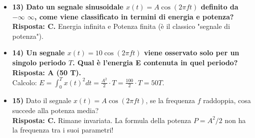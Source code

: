 \begin{itemize}
    \item \textbf{13) Dato un segnale sinusoidale $x(t) = A \cos(2\pi f t)$ definito da $-\infty$ $\infty$, come viene classificato in termini di energia e potenza?} \\
    \textbf{Risposta: C.} Energia infinita e Potenza finita (è il classico "segnale di potenza").

    \item \textbf{14) Un segnale $x(t) = 10 \cos(2\pi f t)$ viene osservato solo per un singolo periodo $T$. Qual è l'energia E contenuta in quel periodo?} \\
    \textbf{Risposta: A (50 T).} \\
    Calcolo: $E = \int_0^T x(t)^2 dt = \frac{A^2}{2} \cdot T = \frac{100}{2} \cdot T = 50T$.

    \item \textbf{15)} Dato il segnale $x(t) = A \cos(2\pi f t)$, se la frequenza $f$ raddoppia, cosa succede alla potenza media? \\
    \textbf{Risposta: C.} Rimane invariata.
    La formula della potenza $P = A^2/2$ non ha la frequenza tra i suoi parametri!
\end{itemize}